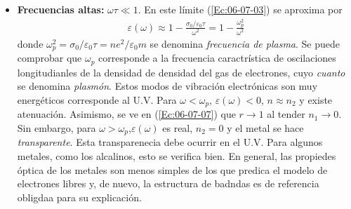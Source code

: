 \begin{itemize}
	\item \textbf{Frecuencias altas:} $\omega \tau \ll 1$. En este límite (\ref{Ec:06-07-03}) se aproxima por 
	\begin{eqnarray}
	\varepsilon (\omega) \approx 1 - \frac{\sigma_0 /\varepsilon_0 \tau}{\omega^2} = 1 - \frac{\omega_p^2}{\omega^2}
	\end{eqnarray}
	donde $\omega_p^2 = \sigma_0 / \varepsilon_0 \tau = ne^2 / \varepsilon_0 m$ se denomina \textit{frecuencia de plasma}. Se puede comprobar que $\omega_p$ corresponde a la frecuencia caractrística de oscilaciones longitudianles de la densidad de densidad del gas de electrones, cuyo \textit{cuanto} se denomina \textit{plasmón}. Estos modos de vibración electrónicas son muy energéticos corresponde al U.V. Para $\omega < \omega_p$, $\varepsilon(\omega)<0$, $n\approx n_2$ y existe atenuación. Asimismo, se ve en (\ref{Ec:06-07-07}) que $r \rightarrow 1$ al tender $n_1 \rightarrow 0$. Sin embargo, para $\omega > \omega_p$,$\varepsilon(\omega)$ es real, $n_2=0$ y el metal se hace \textit{transparente}. Esta transparenecia debe ocurrir en el U.V. Para algunos metales, como los alcalinos, esto se verifica bien. En general, las propiedes óptica de los metales son menos simples de los que predica el modelo de electrones libres y, de nuevo, la estructura de badndas es de referencia obligdaa para su explicación.
\end{itemize}